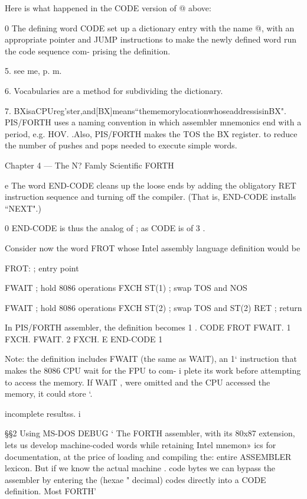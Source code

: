 Here is what happened in the CODE version of @ above:

0 The deﬁning word CODE set up a dictionary entry with the
name @, with an appropriate pointer and JUMP instructions
to make the newly deﬁned word run the code sequence com-
prising the deﬁnition.

 

5. see me, p. m.

6. Vocabularies are a method for subdividing the dictionary.

7. BXisaCPUreg'ster,and[BX]means“thememorylocationwhoseaddressisinBX".
PIS/FORTH uses a naming convention in which assembler mnemonics end with a period, e.g.
HOV. .Also, PIS/FORTH makes the TOS the BX register. to reduce the number of pushes and
pops needed to execute simple words.

Chapter 4 — The N? Famly Scientiﬁc FORTH

e The word END-CODE cleans up the loose ends by adding
the obligatory RET instruction sequence and turning off the
compiler. (That is, END-CODE installs “NEXT".)

0 END-CODE is thus the analog of ; as CODE is of 3 .

Consider now the word FROT whose Intel assembly language
deﬁnition would be

FROT: ; entry point

FWAIT ; hold 8086 operations
FXCH ST(1) ; swap TOS and NOS

FWAIT ; hold 8086 operations
FXCH ST(2) ; swap TOS and ST(2)
RET ; return

In PIS/FORTH assembler, the deﬁnition becomes 1 .
CODE FROT FWAIT. 1 FXCH. FWAIT. 2 FXCH. E
END-CODE 1

Note: the definition includes FWAIT (the same as WAlT), an 1‘
instruction that makes the 8086 CPU wait for the FPU to com- i
plete its work before attempting to access the memory. If WAlT ,
were omitted and the CPU accessed the memory, it could store ‘.

incomplete resultss. i

 

§§2 Using MS-DOS DEBUG ‘
The FORTH assembler, with its 80x87 extension, lets us
develop machine-coded words while retaining Intel mnemon»
ics for documentation, at the price of loading and compiling the:
entire ASSEMBLER lexicon. But if we know the actual machine .
code bytes we can bypass the assembler by entering the (hexae "
decimal) codes directly into a CODE definition. Most FORTH’

